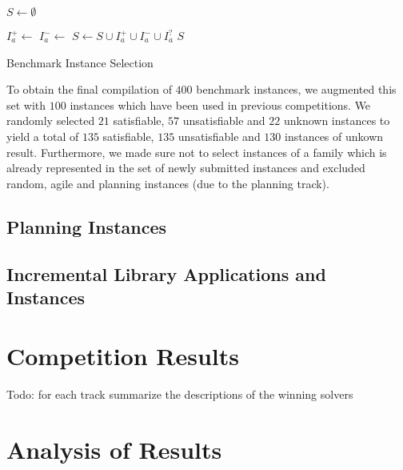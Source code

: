 \documentclass{elsarticle}
\newcommand{\todo}[1]{{\color{purple}Todo: #1}}
\begin{document}
\begin{algorithm}[t]
\DontPrintSemicolon

\BlankLine
$S \leftarrow \emptyset$\;

 {
	$I_a^+ \leftarrow$ \;	
	$I_a^- \leftarrow$ \;	
	$S \leftarrow S \cup I_a^+ \cup I_a^- \cup I_a^?$\;	
}
\Return $S$\;

\caption{Benchmark Instance Selection}
\label{algo:select}
\end{algorithm}

To obtain the final compilation of $400$ benchmark instances, we augmented this set with $100$ instances which have been used in previous competitions. 
We randomly selected $21$ satisfiable, $57$ unsatisfiable and $22$ unknown instances to yield a total of $135$ satisfiable, $135$ unsatisfiable and $130$ instances of unkown result. 
Furthermore, we made sure not to select instances of a family which is already represented in the set of newly submitted instances and excluded random, agile and planning instances (due to the planning track). 


\subsection{Planning Instances}

\subsection{Incremental Library Applications and Instances}


\section{Competition Results}

\todo{for each track summarize the descriptions of the winning solvers}


\section{Analysis of Results}
\end{document}
